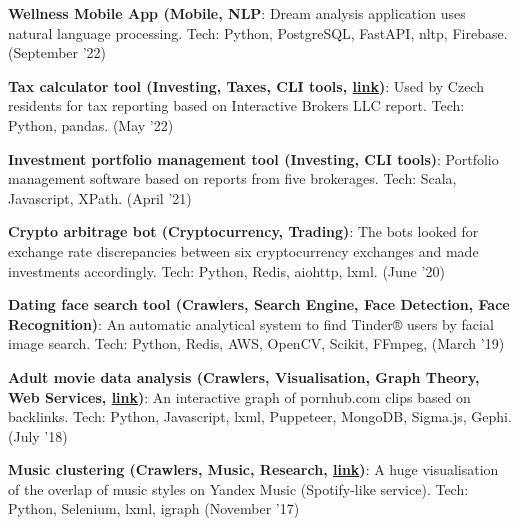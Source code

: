 \documentclass[a4paper,20pt]{article}
\newcommand{\resumeItem}[2]{
  \item\small{
    \textbf{#1}{: #2 \vspace{-2pt}}
  }
}
\newcommand{\resumeSubItem}[2]{\resumeItem{#1}{#2}\vspace{-3pt}}
\newcommand{\padding}{\vspace{2pt}}
\begin{document}
    \resumeSubItem{Wellness Mobile App (Mobile, NLP}{Dream analysis application uses natural language processing. Tech: Python, PostgreSQL, FastAPI, nltp, Firebase. (September '22)}
    \padding

    \resumeSubItem{Tax calculator tool (Investing, Taxes, CLI tools, \href{https://github.com/esemi/investments/tree/devel\#investments}{link})}{Used by Czech residents for tax reporting based on Interactive Brokers LLC report. Tech: Python, pandas. (May '22)}
    \padding

    \resumeSubItem{Investment portfolio management tool (Investing, CLI tools)}{Portfolio management software based on reports from five brokerages. Tech: Scala, Javascript, XPath. (April '21)}
    \padding

    \resumeSubItem{Crypto arbitrage bot (Cryptocurrency, Trading)}{The bots looked for exchange rate discrepancies between six cryptocurrency exchanges and made investments accordingly. Tech: Python, Redis, aiohttp, lxml. (June '20)}
    \padding

    \resumeSubItem{Dating face search tool (Crawlers, Search Engine, Face Detection, Face Recognition)}{An automatic analytical system to find Tinder® users by facial image search. Tech: Python, Redis, AWS, OpenCV, Scikit, FFmpeg, (March '19)}
    \padding

    \resumeSubItem{Adult movie data analysis (Crawlers, Visualisation, Graph Theory, Web Services, \href{https://esemi.github.io/pornhub-graph/}{link})}{An interactive graph of pornhub.com clips based on backlinks. Tech: Python, Javascript, lxml, Puppeteer, MongoDB, Sigma.js, Gephi. (July '18)}
    \padding

    \resumeSubItem{Music clustering (Crawlers, Music, Research, \href{https://habr.com/ru/company/semrush/blog/337216/}{link})}{A huge visualisation of the overlap of music styles on Yandex Music (Spotify-like service). Tech: Python, Selenium, lxml, igraph (November '17)}
    \padding


\end{document}
